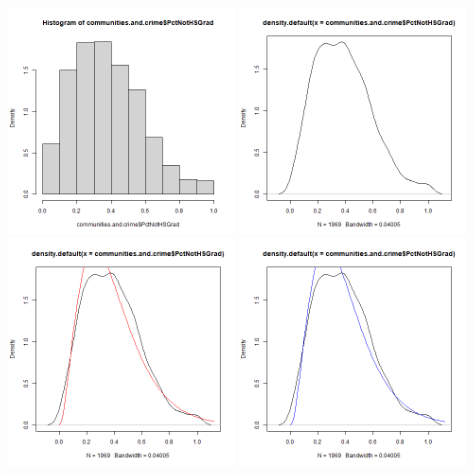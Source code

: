 \documentclass[12pt, letterpaper]{report}
\begin{document}
\begin{center}
\includegraphics[width=0.45\textwidth]{gamma/PctNotHsGrad_hist}
\includegraphics[width=0.45\textwidth]{gamma/PctNotHsGrad_density}
\includegraphics[width=0.45\textwidth]{gamma/PctNotHsGrad_mle}
\includegraphics[width=0.45\textwidth]{gamma/PctNotHsGrad_mm}
\end{center}
\end{document}
